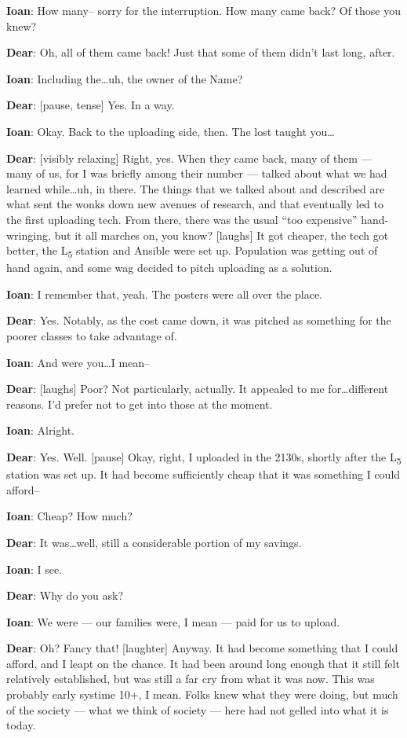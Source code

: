 \textbf{Ioan}: How many-- sorry for the interruption. How many came back? Of those you knew?

\textbf{Dear}: Oh, all of them came back! Just that some of them didn't last long, after.

\textbf{Ioan}: Including the\ldots{}uh, the owner of the Name?

\textbf{Dear}: {[}pause, tense{]} Yes. In a way.

\textbf{Ioan}: Okay. Back to the uploading side, then. The lost taught you\ldots{}

\textbf{Dear}: {[}visibly relaxing{]} Right, yes. When they came back, many of them — many of us, for I was briefly among their number — talked about what we had learned while\ldots{}uh, in there. The things that we talked about and described are what sent the wonks down new avenues of research, and that eventually led to the first uploading tech. From there, there was the usual ``too expensive'' hand-wringing, but it all marches on, you know? {[}laughs{]} It got cheaper, the tech got better, the L\textsubscript{5} station and Ansible were set up. Population was getting out of hand again, and some wag decided to pitch uploading as a solution.

\textbf{Ioan}: I remember that, yeah. The posters were all over the place.

\textbf{Dear}: Yes. Notably, as the cost came down, it was pitched as something for the poorer classes to take advantage of.

\textbf{Ioan}: And were you\ldots{}I mean--

\textbf{Dear}: {[}laughs{]} Poor? Not particularly, actually. It appealed to me for\ldots{}different reasons. I'd prefer not to get into those at the moment.

\textbf{Ioan}: Alright.

\textbf{Dear}: Yes. Well. {[}pause{]} Okay, right, I uploaded in the 2130s, shortly after the L\textsubscript{5} station was set up. It had become sufficiently cheap that it was something I could afford--

\textbf{Ioan}: Cheap? How much?

\textbf{Dear}: It was\ldots{}well, still a considerable portion of my savings.

\textbf{Ioan}: I see.

\textbf{Dear}: Why do you ask?

\textbf{Ioan}: We were — our families were, I mean — paid for us to upload.

\textbf{Dear}: Oh? Fancy that! {[}laughter{]} Anyway. It had become something that I could afford, and I leapt on the chance. It had been around long enough that it still felt relatively established, but was still a far cry from what it was now. This was probably early systime 10+, I mean. Folks knew what they were doing, but much of the society — what we think of society — here had not gelled into what it is today.

